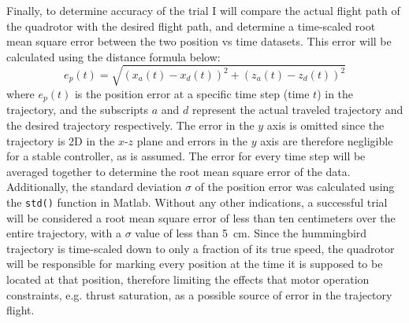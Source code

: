 \documentclass[onecolumn,10pt]{IEEEtran}
\newcommand{\MATLAB}{Matlab}
\begin{document}
Finally, to determine accuracy of the trial I will compare the actual flight path of the quadrotor with the desired flight path, and determine a time-scaled root mean square error between the two position vs time datasets. This error will be calculated using the distance formula  below:
\begin{equation}
e_p(t) = \sqrt{(x_a(t)-x_d(t))^2 + (z_a(t)-z_d(t))^2}
\label{eq:demonstration-1}
\end{equation}
where $e_p(t)$ is the position error at a specific time step (time $t$) in the trajectory, and the subscripts $a$ and $d$ represent the actual traveled trajectory and the desired trajectory respectively. The error in the $y$ axis is omitted since the trajectory is 2D in the $x$-$z$ plane and errors in the $y$ axis are therefore negligible for a stable controller, as is assumed. The error for every time step will be averaged together to determine the root mean square error of the data. Additionally, the standard deviation $\sigma$ of the position error was calculated using the \lstinline{std()} function in \MATLAB. Without any other indications, a successful trial will be considered a root mean square error of less than ten centimeters over the entire trajectory, with a $\sigma$ value of less than \SI{5}{\centi\meter}. Since the hummingbird trajectory is time-scaled down to only a fraction of its true speed, the quadrotor will be responsible for marking every position at the time it is supposed to be located at that position, therefore limiting the effects that motor operation constraints, e.g. thrust saturation, as a possible source of error in the trajectory flight.
\end{document}
